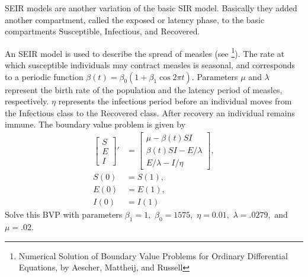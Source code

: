 \begin{problem}
SEIR models are another variation of the basic SIR model.
Basically they added another compartment, called the exposed or latency phase, to the basic compartments Susceptible, Infectious, and Recovered. 

An SEIR model is used to describe the spread of measles (see \footnote{Numerical Solution of Boundary Value Problems for Ordinary Differential Equations, by Aescher, Mattheij, and Russell}).
The rate at which susceptible individuals may contract measles is seasonal, and corresponds to a periodic function $\beta(t) = \beta_0(1 + \beta_1 \cos{2\pi t})$.
Parameters $\mu$ and $\lambda$ represent the birth rate of the population and the latency period of measles, respectively.
$\eta$ represents the infectious period before an individual moves from the Infectious class to the Recovered class.
After recovery an individual remains immune.
The boundary value problem is given by
\begin{align*}
\left[\begin{array}{c}S \\ E \\ I\end{array}\right]' &= \left[\begin{array}{c}\mu - \beta(t) S I \\\beta(t) SI - E/\lambda \\E/\lambda - I/\eta\end{array}\right],\\
S(0) &= S(1),\\
E(0) &= E(1),\\
I(0) &= I(1)
\end{align*}
Solve this BVP with parameters $\beta_1 = 1,$ $\beta_0 = 1575,$ $\eta = 0.01,$ $\lambda = .0279,$ and $\mu = .02.$


\end{problem}

